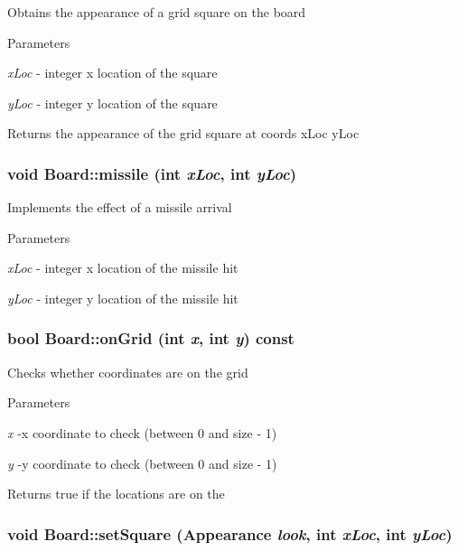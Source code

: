 \label{class_board_a24e413281caad849124fc21df3b3a4da}
Obtains the appearance of a grid square on the board 
\begin{DoxyParams}{Parameters}
\item[{\em xLoc}]-\/ integer x location of the square \item[{\em yLoc}]-\/ integer y location of the square \end{DoxyParams}
\begin{DoxyReturn}{Returns}
the appearance of the grid square at coords xLoc yLoc 
\end{DoxyReturn}
\hypertarget{class_board_a912a73d19979c5c630f9537b1555cbc8}{
\subsubsection[{missile}]{\setlength{\rightskip}{0pt plus 5cm}void Board::missile (int {\em xLoc}, \/  int {\em yLoc})}}
\label{class_board_a912a73d19979c5c630f9537b1555cbc8}
Implements the effect of a missile arrival 
\begin{DoxyParams}{Parameters}
\item[{\em xLoc}]-\/ integer x location of the missile hit \item[{\em yLoc}]-\/ integer y location of the missile hit \end{DoxyParams}
\hypertarget{class_board_a11d4c986e5c58a9a8544e19f24c67fac}{
\subsubsection[{onGrid}]{\setlength{\rightskip}{0pt plus 5cm}bool Board::onGrid (int {\em x}, \/  int {\em y}) const}}
\label{class_board_a11d4c986e5c58a9a8544e19f24c67fac}
Checks whether coordinates are on the grid 
\begin{DoxyParams}{Parameters}
\item[{\em x}]-\/x coordinate to check (between 0 and size -\/ 1) \item[{\em y}]-\/y coordinate to check (between 0 and size -\/ 1) \end{DoxyParams}
\begin{DoxyReturn}{Returns}
true if the locations are on the 
\end{DoxyReturn}
\hypertarget{class_board_a525f28458fc0a3ea79fdd69dfaa50192}{
\subsubsection[{setSquare}]{\setlength{\rightskip}{0pt plus 5cm}void Board::setSquare (Appearance {\em look}, \/  int {\em xLoc}, \/  int {\em yLoc})}}
